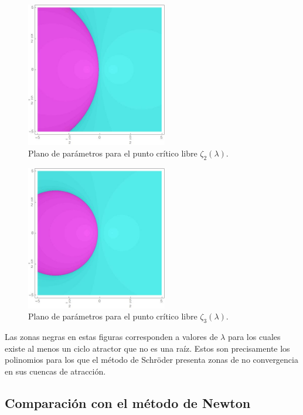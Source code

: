 \begin{figure}[H]
\centering 
\includegraphics[width=0.55\textwidth]{fuentes/articulo-cuadraticos/imagenes/sch_m_7n_6.jpg}
\caption{Plano de parámetros para el punto crítico libre $\zeta_2(\lambda)$.}
\label{fig:plano_param_2}
\end{figure}

\begin{figure}[H]
\centering 
\includegraphics[width=0.55\textwidth]{fuentes/articulo-cuadraticos/imagenes/sch_m_8n_6.jpg}
\caption{Plano de parámetros para el punto crítico libre $\zeta_3(\lambda)$.}
\label{fig:plano_param_3}
\end{figure}

Las zonas negras en estas figuras corresponden a valores de $\lambda$ para los cuales existe al menos un ciclo atractor que no es una raíz. Estos son precisamente los polinomios para los que el método de Schröder presenta zonas de no convergencia en sus cuencas de atracción.

\subsection{Comparación con el método de Newton}


